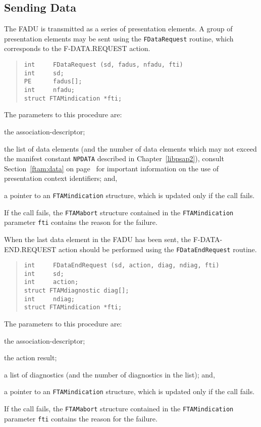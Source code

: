 \subsection	{Sending Data}
The FADU is transmitted as a series of presentation elements.
A group of presentation elements may be sent using the \verb"FDataRequest"
routine,
which corresponds to the {\sf F-DATA.REQUEST\/} action.
\begin{quote}\small\begin{verbatim}
int     FDataRequest (sd, fadus, nfadu, fti)
int     sd;
PE      fadus[];
int     nfadu;
struct FTAMindication *fti;
\end{verbatim}\end{quote}
The parameters to this procedure are:
\begin{describe}
\item[\verb"sd":] the association-descriptor;

\item[\verb"fadus"/\verb"nfadu":] the list of data elements
(and the number of data elements which may not exceed the manifest constant
\verb"NPDATA" described in Chapter~\ref{libpsap2}),
consult Section~\ref{ftam:data} on page~\pageref{ftam:data} for important
information on the use of presentation context identifiers;
and,

\item[\verb"fti":] a pointer to an \verb"FTAMindication" structure, which is
updated only if the call fails.
\end{describe}
If the call fails,
the \verb"FTAMabort" structure contained in the
\verb"FTAMindication" parameter \verb"fti" contains the reason for the failure.

When the last data element in the FADU has been sent,
the {\sf F-DATA-END.REQUEST\/} action should be performed
using the \verb"FDataEndRequest" routine.
\begin{quote}\small\begin{verbatim}
int     FDataEndRequest (sd, action, diag, ndiag, fti)
int     sd;
int     action;
struct FTAMdiagnostic diag[];
int     ndiag;
struct FTAMindication *fti;
\end{verbatim}\end{quote}
The parameters to this procedure are:
\begin{describe}
\item[\verb"sd":] the association-descriptor;

\item[\verb"action":] the action result;

\item[\verb"diag"/\verb"ndiag":] a list of diagnostics
(and the number of diagnostics in the list);
and,

\item[\verb"fti":] a pointer to an \verb"FTAMindication" structure, which is
updated only if the call fails.
\end{describe}
If the call fails,
the \verb"FTAMabort" structure contained in the
\verb"FTAMindication" parameter \verb"fti" contains the reason for the failure.

